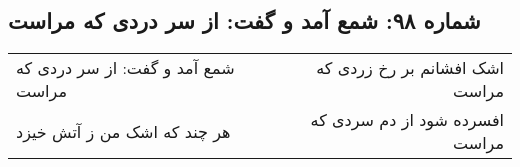 \begin{center}
\section*{شماره ۹۸: شمع آمد و گفت: از سر دردی که مراست}
\label{sec:098}
\begin{longtable}{l p{0.5cm} r}
شمع آمد و گفت: از سر دردی که مراست
&&
اشک افشانم بر رخ زردی که مراست
\\
هر چند که اشک من ز آتش خیزد
&&
افسرده شود از دم سردی که مراست
\\
\end{longtable}
\end{center}
